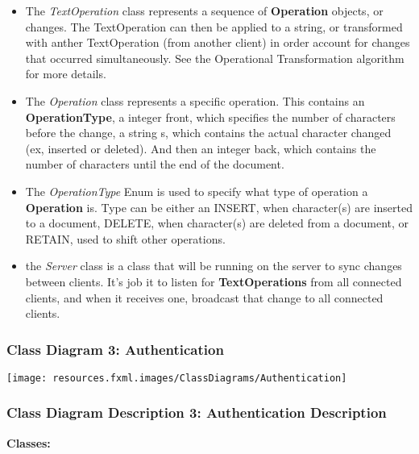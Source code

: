 \documentclass[twoside,letterpaper]{article}
\begin{document}
{\begin{itemize}
\item The \textit{TextOperation} class represents a sequence of \textbf{Operation} objects, or changes. The TextOperation can then be applied to a string, or transformed with anther TextOperation (from another client) in order account for changes that occurred simultaneously. See the Operational Transformation algorithm for more details.
\item The \textit{Operation} class represents a specific operation. This contains an \textbf{OperationType}, a integer front, which specifies the number of characters before the change, a string s, which contains the actual character changed (ex, inserted or deleted). And then an integer back, which contains the number of characters until the end of the document.
\item The \textit{OperationType} Enum is used to specify what type of operation a \textbf{Operation} is. Type can be either an INSERT, when character(s) are inserted to a document, DELETE, when character(s) are deleted from a document, or RETAIN, used to shift other operations.
\item the \textit{Server} class is a class that will be running on the server to sync changes between clients. It's job it to listen for \textbf{TextOperations} from all connected clients, and when it receives one, broadcast that change to all connected clients.
\end{itemize}
\newpage
\subsubsection[Class Diagram 3: Authentication]{\rmfamily\bfseries\color{black}
	Class Diagram 3: Authentication}
\hypertarget{RefHeading22059017292}{}
\bigskip

\texttt{[image: resources.fxml.images/ClassDiagrams/Authentication]}

\newpage

\subsubsection[Class Diagram Description 3: Authentication Description]{\rmfamily\bfseries\color{black}
	Class Diagram Description 3: Authentication Description}
\hypertarget{RefHeading22059017292}{}

\textbf{Classes:}
\begin{itemize}


\end{itemize}}
\end{document}
